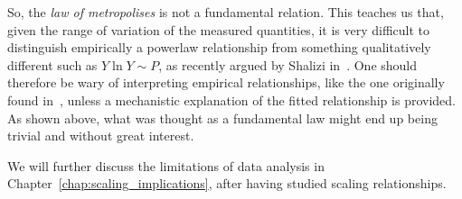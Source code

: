 So, the \emph{law of metropolises} is not a fundamental relation.
This teaches us that, given the range of variation of the measured
quantities, it is very difficult to distinguish empirically a powerlaw
relationship from something qualitatively different such as $Y \ln Y \sim P$, as
recently argued by Shalizi in~\cite{Shalizi:2011}.
One should therefore be wary of interpreting empirical relationships,
like the one originally found in~\cite{Pumain:1997}, unless a mechanistic
explanation of the fitted relationship is provided. As shown above, what
was thought as a fundamental law might end up being trivial and without great
interest.

We will further discuss the limitations of data analysis in
Chapter~\ref{chap:scaling_implications}, after having studied scaling relationships.



